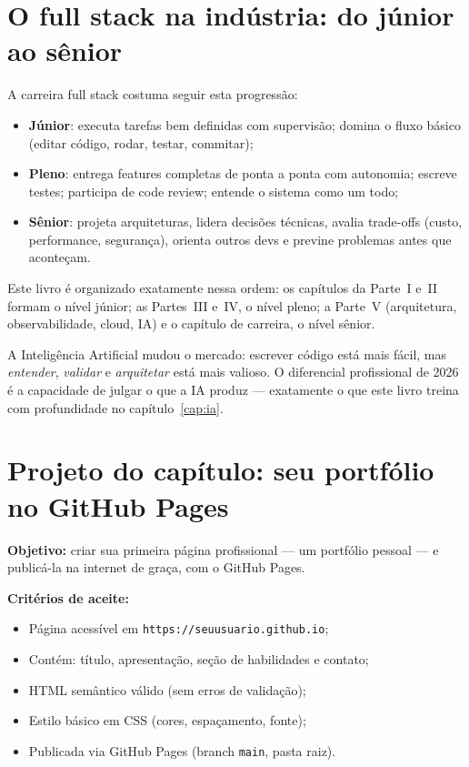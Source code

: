 \section{O full stack na indústria: do júnior ao sênior}

A carreira full stack costuma seguir esta progressão:

\begin{itemize}[leftmargin=*, itemsep=0.4em]
  \item \textbf{Júnior}: executa tarefas bem definidas com supervisão; domina
  o fluxo básico (editar código, rodar, testar, commitar);
  \item \textbf{Pleno}: entrega features completas de ponta a ponta com
  autonomia; escreve testes; participa de code review; entende o sistema como um todo;
  \item \textbf{Sênior}: projeta arquiteturas, lidera decisões técnicas, avalia
  trade-offs (custo, performance, segurança), orienta outros devs e previne
  problemas antes que aconteçam.
\end{itemize}

Este livro é organizado exatamente nessa ordem: os capítulos da Parte~I e~II
formam o nível júnior; as Partes~III e~IV, o nível pleno; a Parte~V (arquitetura,
observabilidade, cloud, IA) e o capítulo de carreira, o nível sênior.

\begin{caixadica}
A Inteligência Artificial mudou o mercado: escrever código está mais fácil, mas
\emph{entender}, \emph{validar} e \emph{arquitetar} está mais valioso. O
diferencial profissional de 2026 é a capacidade de julgar o que a IA produz —
exatamente o que este livro treina com profundidade no capítulo~\ref{cap:ia}.
\end{caixadica}

\section{Projeto do capítulo: seu portfólio no GitHub Pages}
\label{sec:projeto1}

\begin{caixaprojeto}
\textbf{Objetivo:} criar sua primeira página profissional — um portfólio
pessoal — e publicá-la na internet de graça, com o GitHub Pages.

\textbf{Critérios de aceite:}
\begin{itemize}[leftmargin=*, itemsep=0.2em]
  \item Página acessível em \texttt{https://seuusuario.github.io};
  \item Contém: título, apresentação, seção de habilidades e contato;
  \item HTML semântico válido (sem erros de validação);
  \item Estilo básico em CSS (cores, espaçamento, fonte);
  \item Publicada via GitHub Pages (branch \texttt{main}, pasta raiz).
\end{itemize}
\end{caixaprojeto}

